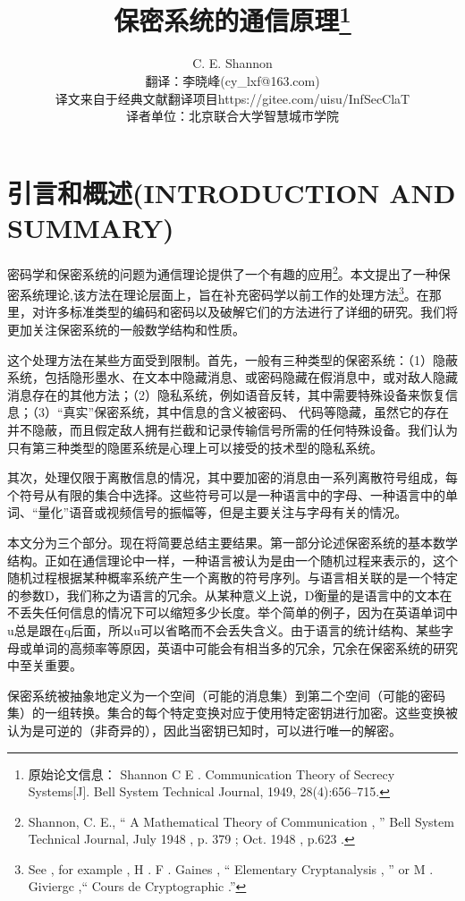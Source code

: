 \documentclass[]{article}
\title{保密系统的通信原理\footnote{原始论文信息： Shannon C E . Communication Theory of Secrecy Systems[J]. Bell System Technical Journal, 1949, 28(4):656–715.}}
\author{C. E. Shannon\\
{\small  翻译：李晓峰(cy\_lxf@163.com)}\\
{\small  译文来自于经典文献翻译项目https://gitee.com/uisu/InfSecClaT}\\
{\small 译者单位：北京联合大学智慧城市学院}
}
\begin{document}
	
\maketitle
	
	
	\section{引言和概述(INTRODUCTION AND SUMMARY)}
	密码学和保密系统的问题为通信理论提供了一个有趣的应用\footnote{Shannon, C. E., “ A Mathematical Theory of Communication , ”
	Bell System Technical Journal, July 1948 , p. 379 ; Oct. 1948 , p.623 .}。本文提出了一种保密系统理论,该方法在理论层面上，旨在补充密码学以前工作的处理方法\footnote{See , for example , H . F . Gaines , “ Elementary Cryptanalysis , ” or M . Giviergc ,“ Cours de Cryptographic .”}。在那里，对许多标准类型的编码和密码以及破解它们的方法进行了详细的研究。我们将更加关注保密系统的一般数学结构和性质。\par


这个处理方法在某些方面受到限制。首先，一般有三种类型的保密系统：（1）隐蔽系统，包括隐形墨水、在文本中隐藏消息、或密码隐藏在假消息中，或对敌人隐藏消息存在的其他方法；（2）隐私系统，例如语音反转，其中需要特殊设备来恢复信息；（3）“真实”保密系统，其中信息的含义被密码、
代码等隐藏，虽然它的存在并不隐蔽，而且假定敌人拥有拦截和记录传输信号所需的任何特殊设备。我们认为只有第三种类型的隐匿系统是心理上可以接受的技术型的隐私系统。
\par

其次，处理仅限于离散信息的情况，其中要加密的消息由一系列离散符号组成，每个符号从有限的集合中选择。这些符号可以是一种语言中的字母、一种语言中的单词、“量化”语音或视频信号的振幅等，但是主要关注与字母有关的情况。
\par

本文分为三个部分。现在将简要总结主要结果。第一部分论述保密系统的基本数学结构。正如在通信理论中一样，一种语言被认为是由一个随机过程来表示的，这个随机过程根据某种概率系统产生一个离散的符号序列。与语言相关联的是一个特定的参数D，我们称之为语言的冗余。从某种意义上说，D衡量的是语言中的文本在不丢失任何信息的情况下可以缩短多少长度。举个简单的例子，因为在英语单词中u总是跟在q后面，所以u可以省略而不会丢失含义。由于语言的统计结构、某些字母或单词的高频率等原因，英语中可能会有相当多的冗余，冗余在保密系统的研究中至关重要。
\par

保密系统被抽象地定义为一个空间（可能的消息集）到第二个空间（可能的密码集）的一组转换。集合的每个特定变换对应于使用特定密钥进行加密。这些变换被认为是可逆的（非奇异的），因此当密钥已知时，可以进行唯一的解密。\par
\end{document}
